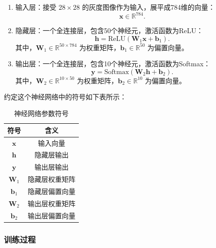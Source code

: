 \begin{enumerate}
  \item 输入层：接受 $28\times28$ 的灰度图像作为输入，展平成784维的向量：
        \begin{equation}
          \mathbf{x} \in \mathbb{R}^{784}.
        \end{equation}

  \item 隐藏层：一个全连接层，包含50个神经元，激活函数为ReLU：
        \begin{equation}
          \mathbf{h} = \text{ReLU}(\mathbf{W}_1 \mathbf{x} + \mathbf{b}_1).
        \end{equation}
        其中，\(\mathbf{W}_1 \in \mathbb{R}^{50 \times 784}\) 为权重矩阵，\(\mathbf{b}_1 \in \mathbb{R}^{50}\) 为偏置向量。

  \item 输出层：一个全连接层，包含10个神经元，激活函数为Softmax：
        \begin{equation}
          \mathbf{y} = \text{Softmax}(\mathbf{W}_2 \mathbf{h} + \mathbf{b}_2).
        \end{equation}
        其中，\(\mathbf{W}_2 \in \mathbb{R}^{10 \times 50}\) 为权重矩阵，\(\mathbf{b}_2 \in \mathbb{R}^{10}\) 为偏置向量。
\end{enumerate}

约定这个神经网络中的符号如下表所示：

\begin{table}[htbp]
  \centering
  \caption{神经网络参数符号}
  \label{tab:nn}
  \begin{tabular}{cc}
    \toprule
    符号             & 含义           \\
    \midrule
    \(\mathbf{x}\)   & 输入向量       \\
    \(\mathbf{h}\)   & 隐藏层输出     \\
    \(\mathbf{y}\)   & 输出层输出     \\
    \(\mathbf{W}_1\) & 隐藏层权重矩阵 \\
    \(\mathbf{b}_1\) & 隐藏层偏置向量 \\
    \(\mathbf{W}_2\) & 输出层权重矩阵 \\
    \(\mathbf{b}_2\) & 输出层偏置向量 \\
    \bottomrule
  \end{tabular}
\end{table}

\subsubsection{训练过程}

